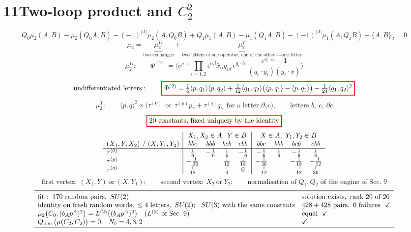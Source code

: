 \documentclass[10pt]{article}
\newcommand{\tagbox}[1]{\fbox{\footnotesize #1}}
\newcommand{\sred}[1]{{\setlength{\fboxrule}{1.1pt}\fcolorbox{red}{white}{$\displaystyle #1$}}}
\newcommand{\ok}{\checkmark}
\begin{document}
\section*{11\quad Two-loop product and $C_2^2$}
\[
Q_0\mu_2(A,B)-\mu_2(Q_0A,B)-(-1)^{|A|}\mu_2(A,Q_0B)+Q_1\mu_1(A,B)-\mu_1(Q_1A,B)-(-1)^{|A|}\mu_1(A,Q_1B)+\{A,B\}_2=0
\]
\[
\mu_2=\underbrace{\mu_2^{D}}_{\text{two exchanges}}+\underbrace{\mu_2^{T}}_{\text{two letters of one operator, one of the other}\ \to\ \text{one letter}}
\]
\[
\mu_2^{D}:\qquad \Phi^{(2)}=\Big\langle e^{p\cdot x}\prod_{i=1,2}\epsilon^{\alpha\beta}\bar x_\alpha q_{i\beta}\,e^{q_i\cdot b_i}\,\frac{e^{q_i\cdot y_i}-1}{(q_i\cdot y_i)(y_i\cdot\bar x)}\Big\rangle
\]
\[
\text{undifferentiated letters}:\qquad
\sred{\Phi^{(2)}=\tfrac16\langle p,q_1\rangle\langle p,q_2\rangle+\tfrac1{12}\langle q_1,q_2\rangle\big(\langle p,q_1\rangle-\langle p,q_2\rangle\big)-\tfrac1{24}\langle q_1,q_2\rangle^2}
\]
\[
\mu_2^{T}:\qquad \langle p,q\rangle^2\times\big(\tau^{(0)}\ \ \text{or}\ \ \tau^{(p)}p_\gamma+\tau^{(q)}q_\gamma\ \ \text{for a letter }\partial_\gamma c\big),\qquad
\text{letters }b,\ c,\ \partial c
\]
\[
\sred{20\text{ constants, fixed uniquely by the identity}}
\]
{\small\[
\begin{array}{l|cccc|cccc}
 & \multicolumn{4}{c|}{X_1,X_2\in A,\ Y\in B} & \multicolumn{4}{c}{X\in A,\ Y_1,Y_2\in B}\\
(X_1,Y,X_2)\ /\ (X,Y_1,Y_2) & bbc & bbb & bcb & cbb & bbc & bbb & bcb & cbb\\\hline
\tau^{(0)} & \tfrac16 & -\tfrac16 & \tfrac16 & -\tfrac16 & -\tfrac16 & \tfrac16 & -\tfrac16 & \tfrac16\\
\tau^{(p)} & -\tfrac1{36} & & \tfrac1{12} & \tfrac1{18} & -\tfrac1{36} & & -\tfrac1{18} & -\tfrac1{12}\\
\tau^{(q)} & \tfrac1{18} & & \tfrac19 & 0 & -\tfrac1{12} & & -\tfrac1{18} & \tfrac1{36}
\end{array}
\]
\[
\text{first vertex}:\ (X_1,Y)\ \text{or}\ (X,Y_1);\qquad \text{second vertex}:\ X_2\ \text{or}\ Y_2;\qquad \text{normalisation of }Q_1,Q_2\text{ of the engine of Sec.\ 9}
\]}
\tagbox{checks}
{\small\[
\begin{array}{ll}
\toprule
\text{fit}:\ 170\text{ random pairs},\ SU(2) & \text{solution exists},\ \text{rank }20\text{ of }20\\
\text{identity on fresh random words},\ \le4\text{ letters},\ SU(2);\ \ SU(3)\text{ with the same constants} & 428+428\text{ pairs},\ 0\text{ failures}\ \ \ok\\
\mu_2\big(C_0,(b_Ap^A)^2\big)=L^{(2)}\big((b_Ap^A)^2\big)\quad(L^{(2)}\text{ of Sec.\ 9}) & \text{equal}\ \ \ok\\
Q_{\rm pert}\big(\mu(C_2,C_2)\big)=0,\ \ N_b=4,3,2 & \ok\\\bottomrule
\end{array}
\]}
\end{document}
